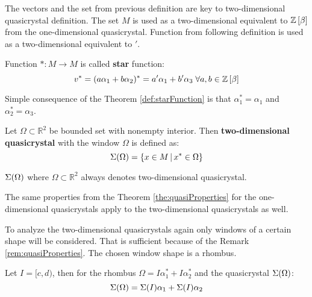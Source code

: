 \documentclass[text.tex]{subfiles}
\begin{document}
\begin{remark}
The vectors and the set from previous definition are key to two-dimensional quasicrystal definition. The set $M$ is used as a two-dimensional equivalent to $\mathbb{Z}\left[\beta\right]$ from the one-dimensional quasicrystal. Function from following definition is used as a two-dimensional equivalent to $'$.
\end{remark}

\begin{definition}
\label{def:starFunction}
Function $\ast: M \to M$ is called \textbf{star} function:
$$v^\ast = (a\alpha_1 + b\alpha_2)^\ast = a'\alpha_1 + b'\alpha_3 \;\forall a,b\in\mathbb{Z}\left[\beta\right]$$
\end{definition}

\begin{remark}
Simple consequence of the Theorem \ref{def:starFunction} is that $\alpha_1^\ast = \alpha_1$ and $\alpha_2^\ast = \alpha_3$.
\end{remark}

\begin{definition}
Let $\Omega \subset \mathbb{R}^2$ be bounded set with nonempty interior. Then \textbf{two-dimensional quasicrystal} with the window $\Omega$ is defined as:
$$\Sigma(\Omega) = \left\{ x \in M\,|\,x^\ast \in \Omega \right\}$$
\end{definition}

\begin{remark}
$\Sigma(\Omega)$ where $\Omega \subset \mathbb{R}^2$ always denotes two-dimensional quasicrystal.
\end{remark}

\begin{remark}
\label{rem:quasiProperties}
The same properties from the Theorem \ref{the:quasiProperties} for the one-dimensional quasicrystals apply to the two-dimensional quasicrystals as well.
\end{remark}

To analyze the two-dimensional quasicrystals again only windows of a certain shape will be considered. That is sufficient because of the Remark \ref{rem:quasiProperties}. The chosen window shape is a rhombus. 

\begin{theorem}
\label{the:twoToOne}
Let $I = [c,d)$, then for the rhombus $\Omega = I\alpha_1^\ast + I\alpha_2^\ast$ and the quasicrystal $\Sigma(\Omega)$: 
$$\Sigma(\Omega) = \Sigma(I)\alpha_1 + \Sigma(I)\alpha_2$$
\end{theorem}
\end{document}
